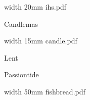\bigskip



\pdfximage width 20mm {ihs.pdf}

\centerline{\pdfrefximage \pdflastximage}



\eject


\bigskip

\bigskip



\eject

\beginpart Candlemas


\bigskip

\pdfximage width 15mm {candle.pdf}

\centerline{\pdfrefximage \pdflastximage}




\bigskip

\eject

\beginpart Lent


\paginaproxima


\paginaproxima

\beginpart Passiontide


\bigskip

\paginaproxima


\bigskip



\eject


\bigskip

\pdfximage width 50mm {fishbread.pdf}

\centerline{\pdfrefximage \pdflastximage}



\bigskip

